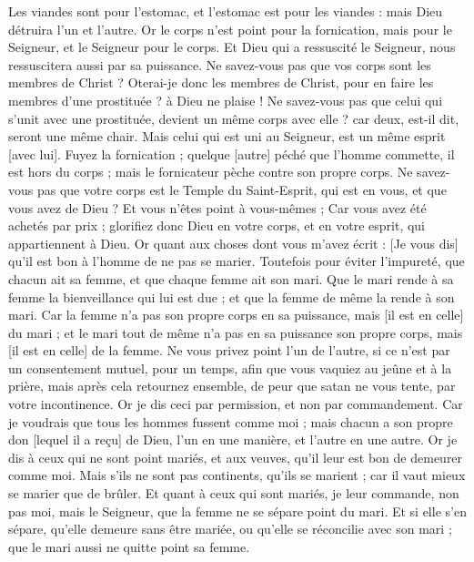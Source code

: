 \begin{multicols}{2}
Les viandes sont pour l'estomac, et l'estomac est pour les viandes : mais Dieu détruira l'un et l'autre. Or le corps n'est point pour la fornication, mais pour le Seigneur, et le Seigneur pour le corps.
Et Dieu qui a ressuscité le Seigneur, nous ressuscitera aussi par sa puissance.
Ne savez-vous pas que vos corps sont les membres de Christ ? Oterai-je donc les membres de Christ, pour en faire les membres d'une prostituée ? à Dieu ne plaise !
Ne savez-vous pas que celui qui s'unit avec une prostituée, devient un même corps avec elle ? car deux, est-il dit, seront une même chair.
Mais celui qui est uni au Seigneur, est un même esprit [avec lui].
Fuyez la fornication ; quelque [autre] péché que l'homme commette, il est hors du corps ; mais le fornicateur pèche contre son propre corps.
Ne savez-vous pas que votre corps est le Temple du Saint-Esprit, qui est en vous, et que vous avez de Dieu ? Et vous n'êtes point à vous-mêmes ;
Car vous avez été achetés par prix ; glorifiez donc Dieu en votre corps, et en votre esprit, qui appartiennent à Dieu.
\VerseOne{}Or quant aux choses dont vous m'avez écrit : [Je vous dis] qu'il est bon à l'homme de ne pas se marier.
Toutefois pour éviter l'impureté, que chacun ait sa femme, et que chaque femme ait son mari.
Que le mari rende à sa femme la bienveillance qui lui est due ; et que la femme de même la rende à son mari.
Car la femme n'a pas son propre corps en sa puissance, mais [il est en celle] du mari ; et le mari tout de même n'a pas en sa puissance son propre corps, mais [il est en celle] de la femme.
Ne vous privez point l'un de l'autre, si ce n'est par un consentement mutuel, pour un temps, afin que vous vaquiez au jeûne et à la prière, mais après cela retournez ensemble, de peur que satan ne vous tente, par votre incontinence.
Or je dis ceci par permission, et non par commandement.
Car je voudrais que tous les hommes fussent comme moi ; mais chacun a son propre don [lequel il a reçu] de Dieu, l'un en une manière, et l'autre en une autre.
Or je dis à ceux qui ne sont point mariés, et aux veuves, qu'il leur est bon de demeurer comme moi.
Mais s'ils ne sont pas continents, qu'ils se marient ; car il vaut mieux se marier que de brûler.
Et quant à ceux qui sont mariés, je leur commande, non pas moi, mais le Seigneur, que la femme ne se sépare point du mari.
Et si elle s'en sépare, qu'elle demeure sans être mariée, ou qu'elle se réconcilie avec son mari ; que le mari aussi ne quitte point sa femme.

\end{multicols}
